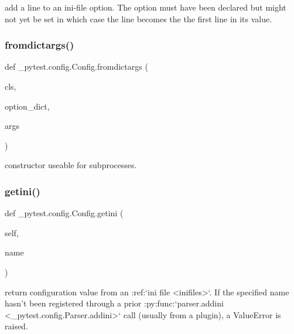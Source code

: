 \begin{DoxyVerb}add a line to an ini-file option. The option must have been
declared but might not yet be set in which case the line becomes the
the first line in its value. \end{DoxyVerb}
 \mbox{\label{class__pytest_1_1config_1_1_config_ad624229020a49d64484ca1f61cba5cfd}} 
\subsubsection{\texorpdfstring{fromdictargs()}{fromdictargs()}}
{\footnotesize\ttfamily def \+\_\+pytest.\+config.\+Config.\+fromdictargs (\begin{DoxyParamCaption}\item[{}]{cls,  }\item[{}]{option\+\_\+dict,  }\item[{}]{args }\end{DoxyParamCaption})}

\begin{DoxyVerb}constructor useable for subprocesses. \end{DoxyVerb}
 \mbox{\label{class__pytest_1_1config_1_1_config_a154273f31343c85ab8562173b623441e}} 
\subsubsection{\texorpdfstring{getini()}{getini()}}
{\footnotesize\ttfamily def \+\_\+pytest.\+config.\+Config.\+getini (\begin{DoxyParamCaption}\item[{}]{self,  }\item[{}]{name }\end{DoxyParamCaption})}

\begin{DoxyVerb}return configuration value from an :ref:`ini file <inifiles>`. If the
specified name hasn't been registered through a prior
:py:func:`parser.addini <_pytest.config.Parser.addini>`
call (usually from a plugin), a ValueError is raised. \end{DoxyVerb}
 \mbox{\label{class__pytest_1_1config_1_1_config_a79e94d2eff1c18db944f563f222c617b}} 
